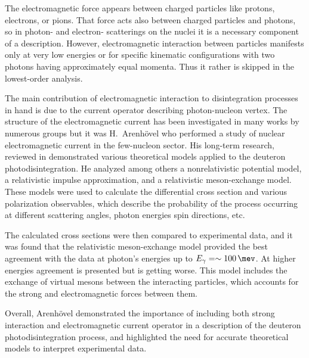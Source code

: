 The electromagnetic force appears between charged particles like protons, electrons, or pions.
That force acts also between charged particles and photons, so 
in photon- and electron- scatterings on the nuclei 
it is a necessary component of a description.
However, electromagnetic interaction between particles manifests only at very 
low energies or for specific kinematic configurations with two
photons having approximately equal momenta.
Thus it rather is skipped in the lowest-order analysis.

The main contribution of electromagnetic interaction 
to disintegration processes in hand is due to the current operator
describing photon-nucleon vertex.
The structure of the electromagnetic current has been investigated
in many works by numerous groups \cite{Carlson1997} but it was 
H.~Arenh\"{o}vel who performed a study of nuclear electromagnetic
current in the few-nucleon sector.
His long-term research, reviewed in \cite{ArenhovelPhotodisint1991}
demonstrated various theoretical models applied to the deuteron photodisintegration.
He analyzed among others a nonrelativistic potential model,
a relativistic impulse approximation, and a relativistic meson-exchange model.
These models were used to calculate the differential cross section and various
polarization observables, which describe the probability
of the process occurring at different scattering angles, photon energies spin directions, etc.

The calculated cross sections were then compared to experimental data, and it was
found that the relativistic meson-exchange model provided
the best agreement with the data at photon's energies up to $E_\gamma = \sim\SI{100}{\mev}$.
At higher energies agreement is presented but is getting worse.
This model includes the exchange of virtual mesons
between the interacting particles, which accounts for
the strong and electromagnetic forces between them.

Overall, Arenh\"{o}vel demonstrated the importance of including both strong interaction
and electromagnetic current operator in a description of the deuteron photodisintegration process,
and highlighted the need for accurate theoretical models to interpret experimental data.



